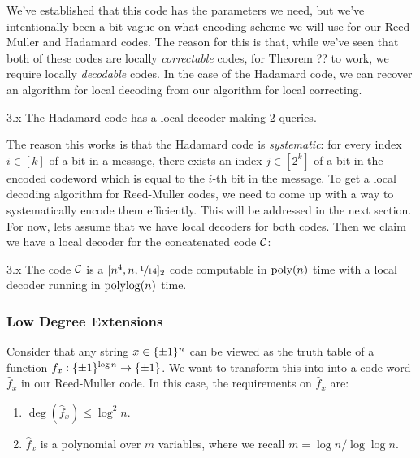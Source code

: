 \documentclass[11pt]{article}
\begin{document}
We've established that this code has the parameters we need, but we've intentionally been a bit vague on what encoding scheme we will use for our Reed-Muller and Hadamard codes. The reason for this is that, while we've seen that both of these codes are locally \emph{correctable} codes, for Theorem ?? to work, we require locally \emph{decodable} codes. In the case of the Hadamard code, we can recover an algorithm for local decoding from our algorithm for local correcting.

\begin{claim}{3.x}
    The Hadamard code has a local decoder making $2$ queries.
\end{claim}

The reason this works is that the Hadamard code is \emph{systematic}: for every index $i \in [k]$ of a bit in a message, there exists an index $j \in [2^k]$ of a bit in the encoded codeword which is equal to the $i$-th bit in the message. To get a local decoding algorithm for Reed-Muller codes, we need to come up with a way to systematically encode them efficiently. This will be addressed in the next section. For now, lets assume that we have local decoders for both codes. Then we claim we have a local decoder for the concatenated code $\mathcal{C}$:

\begin{claim}{3.x}
    The code $\mathcal{C}$ is a $[n^4, n, \sfrac{1}{14}]_2$ code computable in $\mathrm{poly}(n)$ time with a local decoder running in $\mathrm{polylog}(n)$ time.
\end{claim}

\subsubsection{Low Degree Extensions}

Consider that any string $x \in \{\pm 1\}^n$ can be viewed as the truth table of a function $f_x : \{\pm 1\}^{\log n} \rightarrow \{\pm 1\}$. We want to transform this into into a code word $\hat{f}_x$ in our Reed-Muller code. In this case, the requirements on $\hat{f}_x$ are:
\begin{enumerate}
    \item $\deg(\hat{f}_x) \leq \log^2 n$.
    \item $\hat{f}_x$ is a polynomial over $m$ variables, where we recall $m = \log n / \log \log n$.
\end{enumerate}
\end{document}
